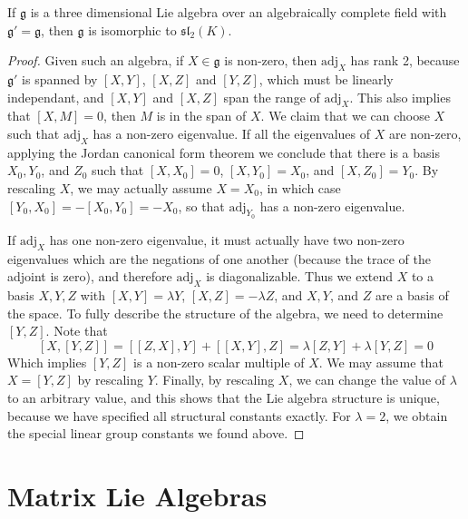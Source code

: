 \begin{theorem}
    If $\mathfrak{g}$ is a three dimensional Lie algebra over an algebraically complete field with $\mathfrak{g}' = \mathfrak{g}$, then $\mathfrak{g}$ is isomorphic to $\mathfrak{sl}_2(K)$.
\end{theorem}
\begin{proof}
Given such an algebra, if $X \in \mathfrak{g}$ is non-zero, then $\text{adj}_X$ has rank 2, because $\mathfrak{g}'$ is spanned by $[X,Y]$, $[X,Z]$ and $[Y,Z]$, which must be linearly independant, and $[X,Y]$ and $[X,Z]$ span the range of $\text{adj}_X$. This also implies that $[X,M] = 0$, then $M$ is in the span of $X$. We claim that we can choose $X$ such that $\text{adj}_X$ has a non-zero eigenvalue. If all the eigenvalues of $X$ are non-zero, applying the Jordan canonical form theorem we conclude that there is a basis $X_0, Y_0$, and $Z_0$ such that $[X,X_0] = 0$, $[X,Y_0] = X_0$, and $[X,Z_0] = Y_0$. By rescaling $X$, we may actually assume $X = X_0$, in which case $[Y_0,X_0] = -[X_0,Y_0] = -X_0$, so that $\text{adj}_{Y_0}$ has a non-zero eigenvalue.

If $\text{adj}_X$ has one non-zero eigenvalue, it must actually have two non-zero eigenvalues which are the negations of one another (because the trace of the adjoint is zero), and therefore $\text{adj}_X$ is diagonalizable. Thus we extend $X$ to a basis $X,Y,Z$ with $[X,Y] = \lambda Y$, $[X,Z] = -\lambda Z$, and $X,Y$, and $Z$ are a basis of the space. To fully describe the structure of the algebra, we need to determine $[Y,Z]$. Note that
%
\[ [X,[Y,Z]] = [[Z,X],Y] + [[X,Y],Z] = \lambda [Z,Y] + \lambda [Y,Z] = 0 \]
%
Which implies $[Y,Z]$ is a non-zero scalar multiple of $X$. We may assume that $X = [Y,Z]$ by rescaling $Y$. Finally, by rescaling $X$, we can change the value of $\lambda$ to an arbitrary value, and this shows that the Lie algebra structure is unique, because we have specified all structural constants exactly. For $\lambda = 2$, we obtain the special linear group constants we found above.
\end{proof}










\chapter{Matrix Lie Algebras}

